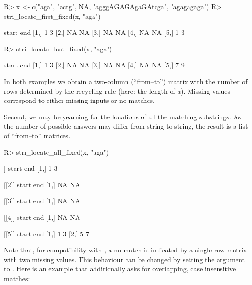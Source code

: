 \documentclass[nojss]{jss}
\begin{document}
\begin{Schunk}
\begin{Sinput}
R> x <- c("aga", "actg", NA, "agggAGAGAgaGAtcga", "agagagaga")
R> stri_locate_first_fixed(x, "aga")
\end{Sinput}
\begin{Soutput}
     start end
[1,]     1   3
[2,]    NA  NA
[3,]    NA  NA
[4,]    NA  NA
[5,]     1   3
\end{Soutput}
\begin{Sinput}
R> stri_locate_last_fixed(x, "aga")
\end{Sinput}
\begin{Soutput}
     start end
[1,]     1   3
[2,]    NA  NA
[3,]    NA  NA
[4,]    NA  NA
[5,]     7   9
\end{Soutput}
\end{Schunk}

\noindent
In both examples we obtain a two-column (``from--to'') matrix
with the number of rows determined by the recycling rule (here:
the length of \textit{x}).
Missing values correspond to either missing inputs or
no-matches.

Second, we may be yearning for the locations of all the matching
substrings. As the number of possible answers may differ from string to string,
the result is a list of ``from--to'' matrices.

\begin{Schunk}
\begin{Sinput}
R> stri_locate_all_fixed(x, "aga")
\end{Sinput}
\begin{Soutput}
[[1]]
     start end
[1,]     1   3

[[2]]
     start end
[1,]    NA  NA

[[3]]
     start end
[1,]    NA  NA

[[4]]
     start end
[1,]    NA  NA

[[5]]
     start end
[1,]     1   3
[2,]     5   7
\end{Soutput}
\end{Schunk}

\noindent
Note that, for compatibility with , a no-match is
indicated by a single-row matrix with two missing values.
This behaviour can be changed by setting the 
argument to . Here is an example that additionally
asks for overlapping, case insensitive matches:
\end{document}
